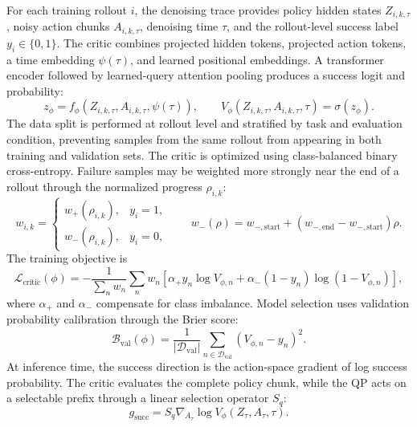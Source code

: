 For each training rollout $i$, the denoising trace provides policy hidden states $Z_{i,k,\tau}$, noisy action chunks $A_{i,k,\tau}$, denoising time $\tau$, and the rollout-level success label $y_i\in\{0,1\}$. The critic combines projected hidden tokens, projected action tokens, a time embedding $\psi(\tau)$, and learned positional embeddings. A transformer encoder followed by learned-query attention pooling produces a success logit and probability:
\begin{equation}
    z_\phi
    =f_\phi\!\left(Z_{i,k,\tau},A_{i,k,\tau},\psi(\tau)\right),
    \qquad
    V_\phi\!\left(Z_{i,k,\tau},A_{i,k,\tau},\tau\right)
    =\sigma(z_\phi).
\end{equation}
The data split is performed at rollout level and stratified by task and evaluation condition, preventing samples from the same rollout from appearing in both training and validation sets. The critic is optimized using class-balanced binary cross-entropy. Failure samples may be weighted more strongly near the end of a rollout through the normalized progress $\rho_{i,k}$:
\begin{equation}
    w_{i,k}=
    \begin{cases}
        w_{+}(\rho_{i,k}), & y_i=1,\\
        w_{-}(\rho_{i,k}), & y_i=0,
    \end{cases}
    \qquad
    w_{-}(\rho)=w_{-,\mathrm{start}}
    +\left(w_{-,\mathrm{end}}-w_{-,\mathrm{start}}\right)\rho .
\end{equation}
The training objective is
\begin{equation}
    \mathcal{L}_{\mathrm{critic}}(\phi)
    =-
    \frac{1}{\sum_n w_n}
    \sum_n w_n
    \left[
        \alpha_{+}y_n\log V_{\phi,n}
        +\alpha_{-}(1-y_n)\log\!\left(1-V_{\phi,n}\right)
    \right],
\end{equation}
where $\alpha_{+}$ and $\alpha_{-}$ compensate for class imbalance. Model selection uses validation probability calibration through the Brier score:
\begin{equation}
    \mathcal{B}_{\mathrm{val}}(\phi)
    =\frac{1}{|\mathcal{D}_{\mathrm{val}}|}
    \sum_{n\in\mathcal{D}_{\mathrm{val}}}
    \left(V_{\phi,n}-y_n\right)^2.
\end{equation}
At inference time, the success direction is the action-space gradient of log success probability. The critic evaluates the complete policy chunk, while the QP acts on a selectable prefix through a linear selection operator $S_q$:
\begin{equation}
    g_{\mathrm{succ}}
    =S_q\nabla_{A_\tau}
    \log V_\phi\!\left(Z_\tau,A_\tau,\tau\right).
\end{equation}


